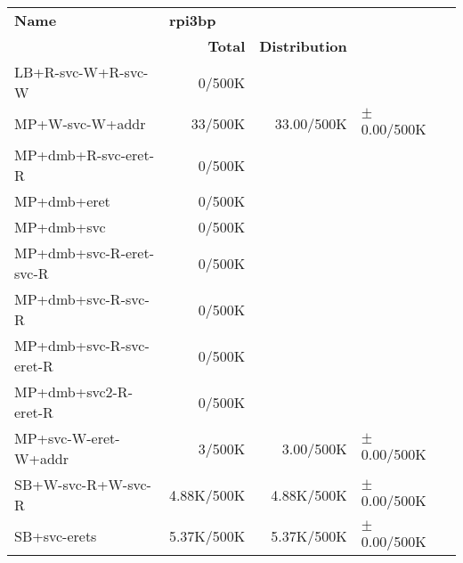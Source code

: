 \begin{tabular}{l  | r r l l}
   \textbf{Name}           & \multicolumn{3}{l}{\textbf{rpi3bp}}                       & \\
                           & \textbf{Total} & \textbf{Distribution} &                 & \\
        LB+R-svc-W+R-svc-W &         0/500K &                       &                 & \\ \hline 
           MP+W-svc-W+addr &        33/500K &            33.00/500K & $\pm$ 0.00/500K & \\ \hline 
       MP+dmb+R-svc-eret-R &         0/500K &                       &                 & \\ \hline 
               MP+dmb+eret &         0/500K &                       &                 & \\ \hline 
                MP+dmb+svc &         0/500K &                       &                 & \\ \hline 
   MP+dmb+svc-R-eret-svc-R &         0/500K &                       &                 & \\ \hline 
        MP+dmb+svc-R-svc-R &         0/500K &                       &                 & \\ \hline 
   MP+dmb+svc-R-svc-eret-R &         0/500K &                       &                 & \\ \hline 
      MP+dmb+svc2-R-eret-R &         0/500K &                       &                 & \\ \hline 
      MP+svc-W-eret-W+addr &         3/500K &             3.00/500K & $\pm$ 0.00/500K & \\ \hline 
        SB+W-svc-R+W-svc-R &     4.88K/500K &            4.88K/500K & $\pm$ 0.00/500K & \\ \hline 
              SB+svc-erets &     5.37K/500K &            5.37K/500K & $\pm$ 0.00/500K & \\ \hline 
\end{tabular}
